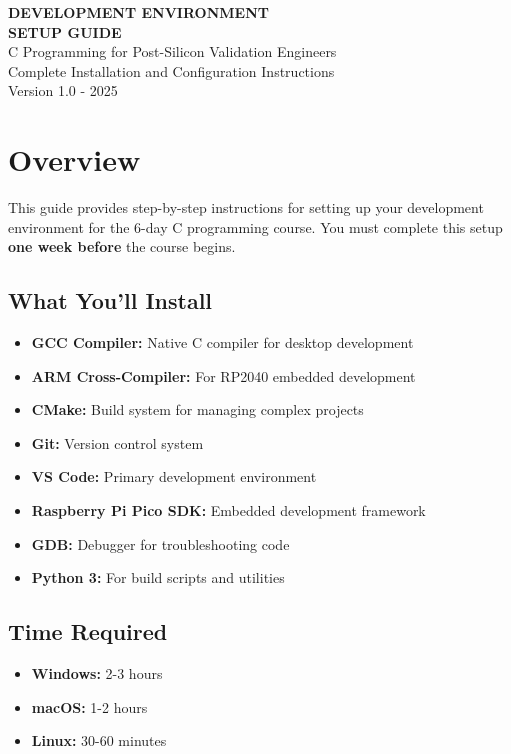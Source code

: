 \documentclass[11pt,a4paper]{article}
\begin{document}
\begin{center}
    {\Huge\bfseries\color{codeblue} DEVELOPMENT ENVIRONMENT}\\[0.3cm]
    {\Huge\bfseries\color{codeblue} SETUP GUIDE}\\[0.5cm]
    {\Large C Programming for Post-Silicon Validation Engineers}\\[0.3cm]
    {\large Complete Installation and Configuration Instructions}\\[0.2cm]
    {\normalsize Version 1.0 - 2025}
\end{center}

\vspace{1cm}

\section{Overview}

This guide provides step-by-step instructions for setting up your development environment for the 6-day C programming course. You must complete this setup \textbf{one week before} the course begins.

\subsection{What You'll Install}
\begin{itemize}
    \item \textbf{GCC Compiler:} Native C compiler for desktop development
    \item \textbf{ARM Cross-Compiler:} For RP2040 embedded development
    \item \textbf{CMake:} Build system for managing complex projects
    \item \textbf{Git:} Version control system
    \item \textbf{VS Code:} Primary development environment
    \item \textbf{Raspberry Pi Pico SDK:} Embedded development framework
    \item \textbf{GDB:} Debugger for troubleshooting code
    \item \textbf{Python 3:} For build scripts and utilities
\end{itemize}

\subsection{Time Required}
\begin{itemize}
    \item \textbf{Windows:} 2-3 hours
    \item \textbf{macOS:} 1-2 hours
    \item \textbf{Linux:} 30-60 minutes
\end{itemize}
\end{document}
